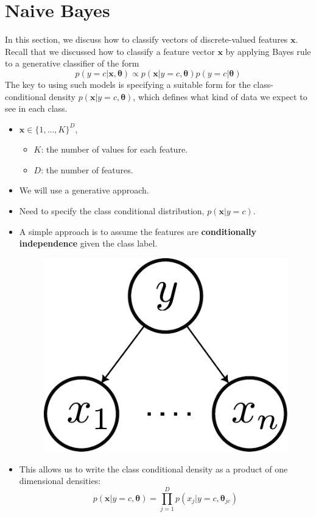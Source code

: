 \section{Naive Bayes}
\label{sec:naive_bayes}

  In this section, we discuss how to classify vectors of discrete-valued features $\mathbf{x}$. Recall that we discussed how to classify a feature vector $\mathbf{x}$ by applying Bayes rule to a generative classifier of the form 
  $$p(y=c|\mathbf{x},\boldsymbol{\theta})\propto p(\mathbf{x}|y=c, \boldsymbol{\theta})p(y=c|\boldsymbol{\theta})$$
  The key to using such models is specifying a suitable form for the class-conditional density $p(\mathbf{x}|y=c, \boldsymbol{\theta})$, which defines what kind of data we expect to see in each class. 
  \begin{itemize}
    \item  $\textbf{x} \in \{1,...,K\}^D$,
    \begin{itemize}
      \item $K$: the number of values for each feature.
      \item $D$: the number of features.
    \end{itemize}
    \item We will use a generative approach.
    \item Need to specify the class conditional distribution, $p(\mathbf{x}|y=c)$.
    \item A simple approach is to assume the features are \textbf{conditionally independence} given the class label.
		\begin{figure}[h]
			\centering
			\includegraphics[scale=0.5]{./images/conditional_independence.pdf}
		\end{figure}
    \item This allows us to write the class conditional density as a product of one dimensional densities:
    $$p(\mathbf{x}|y=c, \boldsymbol{\theta}) = \prod_{j=1}^{D}p(x_j|y=c,\boldsymbol{\theta}_{jc})$$
  \end{itemize}
